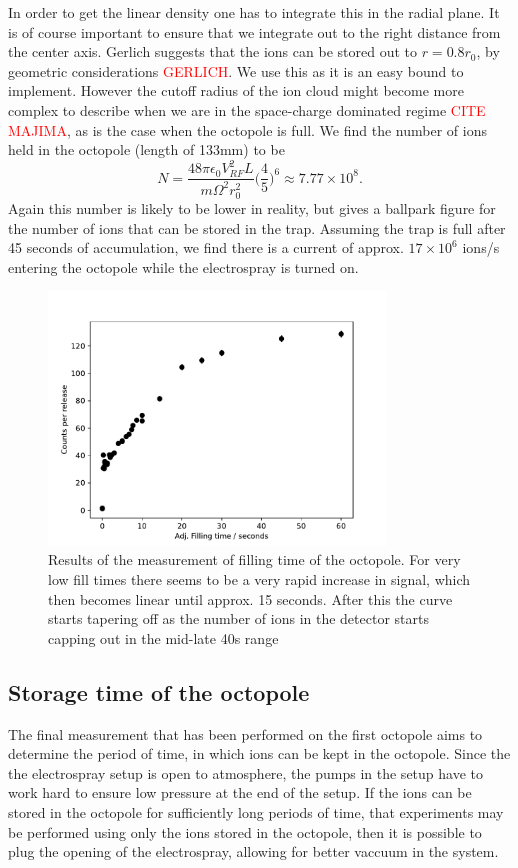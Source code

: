 In order to get the linear density one has to integrate this in the radial plane.
It is of course important to ensure that we integrate out to the right distance from the center axis. Gerlich suggests that the ions can be stored out to $r = 0.8r_0$, by geometric considerations \textcolor{red}{GERLICH}. We use this as it is an easy bound to implement. However the cutoff radius of the ion cloud might become more complex to describe when we are in the 
space-charge dominated regime \textcolor{red}{CITE MAJIMA}, as is the case when the octopole is full. We find the number of ions held in the octopole (length of 133mm) to be
\begin{equation}
    N = \frac{48\pi\epsilon_0V_{RF}^2L}{m\Omega^2r_0^2}\bigg(\frac{4}{5}\bigg)^6\approx 7.77\times 10^8.
\end{equation}
Again this number is likely to be lower in reality, but gives a ballpark figure for the number of ions that can be stored in the trap. Assuming the trap is full after 45 seconds of accumulation, we find there is a current of approx. $17\times 10^6$ ions/s entering the octopole while the electrospray is turned on.


\begin{figure}
    \centering
    \includegraphics[width = 0.8\textwidth]{main/FillingTimeGraph.pdf}
    \caption{Results of the measurement of filling time of the octopole. For very low fill times there seems to be a very rapid increase in signal, which then becomes linear until approx. 15 seconds. After this the curve starts tapering off as the number of ions in the detector starts capping out in the mid-late 40s range}
    \label{fig:fillTimeGraph}
\end{figure}
\subsection{Storage time of the octopole}
The final measurement that has been performed on the first octopole aims to determine the period of time, in which ions can be kept in the octopole. Since the the electrospray setup is open to atmosphere, the pumps in the setup have to work hard to ensure low pressure at the end of the setup.
If the ions can be stored in the octopole for sufficiently long periods of time, that experiments may be performed using only the ions stored in the octopole, then it is possible to plug the opening of the electrospray, allowing for better vaccuum in the system.

